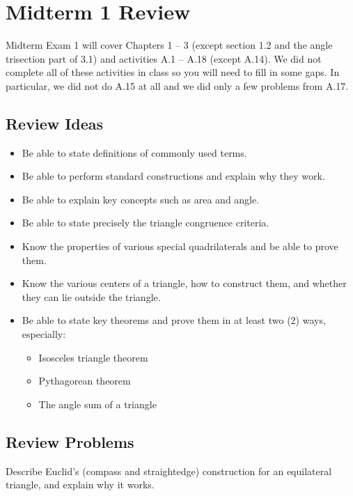 \newpage

\section{Midterm 1 Review}
Midterm Exam 1 will cover Chapters 1 -- 3 (except section 1.2 and the angle trisection part of 3.1) and activities A.1 -- A.18 (except A.14).  We did not complete all of these activities in class so you will need to fill in some gaps.  In particular, we did not do A.15 at all and we did only a few problems from A.17.  
\subsection{Review Ideas}

\begin{itemize}\itemsep0em
\item Be able to state definitions of commonly used terms.
\item Be able to perform standard constructions and explain why they work. 
\item Be able to explain key concepts such as area and angle.   
\item Be able to state precisely the triangle congruence criteria. 
\item Know the properties of various special quadrilaterals and be able to prove them.  
\item Know the various centers of a triangle, how to construct them, and whether they can lie outside the triangle.  
\item Be able to state key theorems and prove them in at least two (2) ways, especially:  
\begin{itemize}
\item Isosceles triangle theorem
\item Pythagorean theorem
\item The angle sum of a triangle 
\end{itemize}
\end{itemize}

\subsection*{Review Problems}
\begin{prob}
Describe Euclid's (compass and straightedge) construction for an equilateral triangle, and explain
why it works.
\end{prob}


